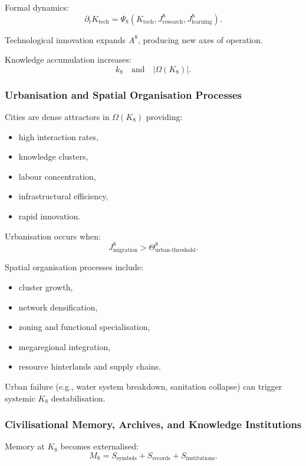 Formal dynamics:
\[
\partial_t K_{\text{tech}}
= \Psi_8(K_{\text{tech}}, J^8_{\text{research}}, J^8_{\text{learning}}).
\]

Technological innovation expands $A^8$, producing new axes of operation.

Knowledge accumulation increases:
\[
k_8 \quad\text{and}\quad |\Omega(K_8)|.
\]

\subsubsection{Urbanisation and Spatial Organisation Processes}

Cities are dense attractors in $\Omega(K_8)$ providing:
\begin{itemize}
    \item high interaction rates,
    \item knowledge clusters,
    \item labour concentration,
    \item infrastructural efficiency,
    \item rapid innovation.
\end{itemize}

Urbanisation occurs when:
\[
J^8_{\text{migration}} > \Theta^8_{\text{urban-threshold}}.
\]

Spatial organisation processes include:
\begin{itemize}
    \item cluster growth,
    \item network densification,
    \item zoning and functional specialisation,
    \item megaregional integration,
    \item resource hinterlands and supply chains.
\end{itemize}

Urban failure (e.g., water system breakdown, sanitation collapse) can
trigger systemic $K_8$ destabilisation.

\subsubsection{Civilisational Memory, Archives, and Knowledge Institutions}

Memory at $K_8$ becomes externalised:
\[
M_8 = S_{\text{symbols}} + S_{\text{records}} + S_{\text{institutions}}.
\]

